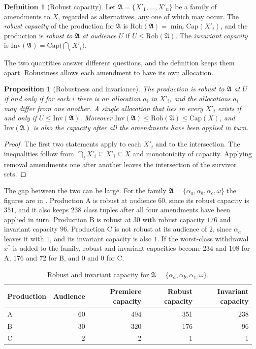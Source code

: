 \documentclass[11pt,twoside,openright]{book}
\theoremstyle{plain}
\newtheorem{proposition}[theorem]{Proposition}
\theoremstyle{definition}
\newtheorem{definition}[theorem]{Definition}
\theoremstyle{remark}
\newcommand{\Capac}{\mathrm{Cap}}
\newcommand{\Rob}{\mathrm{Rob}}
\newcommand{\Inv}{\mathrm{Inv}}
\begin{document}
\begin{definition}[Robust capacity]\label{def:robust-ch9}
Let $\mathfrak A=\{X'_1,\dots,X'_n\}$ be a family of amendments to $X$, regarded as alternatives, any one of which may occur. The \emph{robust capacity} of the production for $\mathfrak A$ is $\Rob(\mathfrak A)=\min_i\Capac(X'_i)$, and the production is \emph{robust to $\mathfrak A$ at audience $U$} if $U\le\Rob(\mathfrak A)$. The \emph{invariant capacity} is $\Inv(\mathfrak A)=\Capac\bigl(\bigcap_iX'_i\bigr)$.
\end{definition}

The two quantities answer different questions, and the definition keeps them apart. Robustness allows each amendment to have its own allocation.

\begin{proposition}[Robustness and invariance]\label{prop:robinv}
The production is robust to $\mathfrak A$ at $U$ if and only if for each $i$ there is an allocation $a_i$ in $X'_i$, and the allocations $a_i$ may differ from one another. A single allocation that lies in every $X'_i$ exists if and only if $U\le\Inv(\mathfrak A)$. Moreover $\Inv(\mathfrak A)\le\Rob(\mathfrak A)\le\Capac(X)$, and $\Inv(\mathfrak A)$ is also the capacity after all the amendments have been applied in turn.
\end{proposition}

\begin{proof}
The first two statements apply  to each $X'_i$ and to the intersection. The inequalities follow from $\bigcap_iX'_i\subseteq X'_i\subseteq X$ and monotonicity of capacity. Applying removal amendments one after another leaves the intersection of the survivor sets.
\end{proof}

The gap between the two can be large. For the family $\mathfrak A=\{\alpha_a,\alpha_b,\alpha_c,\omega\}$ the figures are in . Production A is robust at audience $60$, since its robust capacity is $351$, and it also keeps $238$ class tuples after all four amendments have been applied in turn. Production B is robust at $30$ with robust capacity $176$ and invariant capacity $96$. Production C is not robust at its audience of $2$, since $\alpha_a$ leaves it with $1$, and its invariant capacity is also $1$. If the worst-class withdrawal $x^\ast$ is added to the family, robust and invariant capacities become $234$ and $108$ for A, $176$ and $72$ for B, and $0$ and $0$ for C.

\begin{table}[ht]
\centering
\begin{tabular}{@{}lrrrr@{}}
\toprule
Production & Audience & Premiere capacity & Robust capacity & Invariant capacity\\
\midrule
A & 60 & 494 & 351 & 238\\
B & 30 & 320 & 176 & 96\\
C & 2 & 2 & 1 & 1\\
\bottomrule
\end{tabular}
\caption{Robust and invariant capacity for $\mathfrak A=\{\alpha_a,\alpha_b,\alpha_c,\omega\}$.}\label{tab:robust}
\end{table}
\end{document}
